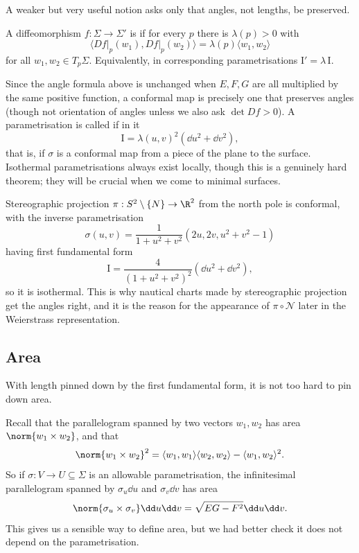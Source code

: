 A weaker but very useful notion asks only that angles, not lengths, be preserved.

\begin{definition}[Conformal]
    A diffeomorphism $f: \Sigma \rightarrow \Sigma'$ is  if for every $p$ there is $\lambda(p) > 0$ with
    $$
    \langle \left.Df\right|_p(w_1), \left.Df\right|_p(w_2)\rangle = \lambda(p)\langle w_1, w_2\rangle
    $$
    for all $w_1, w_2 \in T_p\Sigma$. Equivalently, in corresponding parametrisations $\mathrm{I}' = \lambda\, \mathrm{I}$.
\end{definition}

Since the angle formula above is unchanged when $E, F, G$ are all multiplied by the same positive function, a conformal map is precisely one that preserves angles (though not orientation of angles unless we also ask $\det Df > 0$). A parametrisation is called  if in it
$$
\mathrm{I} = \lambda(u,v)^2\left(\dd u^2 + \dd v^2\right),
$$
that is, if $\sigma$ is a conformal map from a piece of the plane to the surface. Isothermal parametrisations always exist locally, though this is a genuinely hard theorem; they will be crucial when we come to minimal surfaces.

\begin{example}
    Stereographic projection $\pi: S^2 \setminus\{N\} \rightarrow \R^2$ from the north pole is conformal, with the inverse parametrisation
    $$
    \sigma(u,v) = \frac{1}{1 + u^2+v^2}\left(2u, 2v, u^2+v^2-1\right)
    $$
    having first fundamental form
    $$
    \mathrm{I} = \frac{4}{(1+u^2+v^2)^2}\left(\dd u^2 + \dd v^2\right),
    $$
    so it is isothermal. This is why nautical charts made by stereographic projection get the angles right, and it is the reason for the appearance of $\pi \circ \mathcal{N}$ later in the Weierstrass representation.
\end{example}

\subsection{Area}

With length pinned down by the first fundamental form, it is not too hard to pin down area.

Recall that the parallelogram spanned by two vectors $w_1, w_2$ has area $\norm{w_1\times w_2}$, and that
$$
\norm{w_1\times w_2}^2 = \langle w_1, w_1\rangle\langle w_2,w_2\rangle - \langle w_1, w_2\rangle^2.
$$
So if $\sigma: V \rightarrow U \subseteq \Sigma$ is an allowable parametrisation, the infinitesimal parallelogram spanned by $\sigma_u \dd u$ and $\sigma_v \dd v$ has area
$$
\norm{\sigma_u \times \sigma_v}\dd u \dd v = \sqrt{EG-F^2}\dd u\dd v.
$$
This gives us a sensible way to define area, but we had better check it does not depend on the parametrisation.

